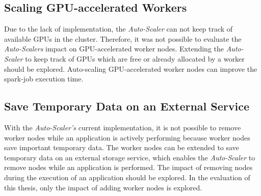 \subsection{Scaling GPU-accelerated Workers}
\label{subsec:08_outlook_gpus}
Due to the lack of implementation, the \textit{Auto-Scaler} can not keep track of available GPUs in the cluster. Therefore, it was not possible to evaluate the \textit{Auto-Scalers} impact on GPU-accelerated worker nodes.
Extending the \textit{Auto-Scaler} to keep track of GPUs which are free or already allocated by a worker should be explored.
%
Auto-scaling GPU-accelerated worker nodes can improve the spark-job execution time.


\subsection{Save Temporary Data on an External Service}
With the \textit{Auto-Scaler's} current implementation, it is not possible to remove worker nodes while an application is actively performing because worker nodes save important temporary data.
The worker nodes can be extended to save temporary data on an external storage service, which enables the \textit{Auto-Scaler} to remove nodes while an application is performed.
% 
The impact of removing nodes during the execution of an application should be explored. In the evaluation of this thesis, only the impact of adding worker nodes is explored.
